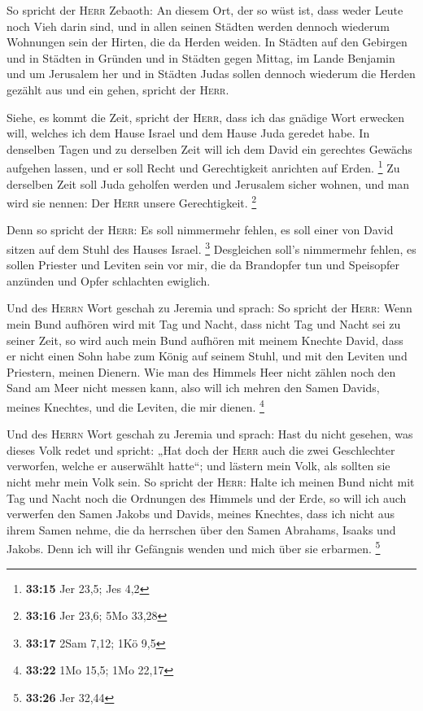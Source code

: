  So spricht der \textsc{Herr} Zebaoth: An diesem Ort, der
so wüst ist, dass weder Leute noch Vieh darin sind, und in allen seinen
Städten werden dennoch wiederum Wohnungen sein der Hirten, die da Herden
weiden.  In Städten auf den Gebirgen und in Städten in
Gründen und in Städten gegen Mittag, im Lande Benjamin und um Jerusalem
her und in Städten Judas sollen dennoch wiederum die Herden gezählt aus
und ein gehen, spricht der \textsc{Herr}.

 Siehe, es kommt die Zeit, spricht der \textsc{Herr},
dass ich das gnädige Wort erwecken will, welches ich dem Hause Israel
und dem Hause Juda geredet habe.  In denselben Tagen und
zu derselben Zeit will ich dem David ein gerechtes Gewächs aufgehen
lassen, und er soll Recht und Gerechtigkeit anrichten auf Erden.
\footnote{\textbf{33:15} Jer 23,5; Jes 4,2}  Zu derselben
Zeit soll Juda geholfen werden und Jerusalem sicher wohnen, und man wird
sie nennen: Der \textsc{Herr} unsere Gerechtigkeit. \footnote{\textbf{33:16}
  Jer 23,6; 5Mo 33,28}

 Denn so spricht der \textsc{Herr}: Es soll nimmermehr
fehlen, es soll einer von David sitzen auf dem Stuhl des Hauses Israel.
\footnote{\textbf{33:17} 2Sam 7,12; 1Kö 9,5}  Desgleichen
soll's nimmermehr fehlen, es sollen Priester und Leviten sein vor mir,
die da Brandopfer tun und Speisopfer anzünden und Opfer schlachten
ewiglich.

 Und des \textsc{Herrn} Wort geschah zu Jeremia und
sprach:  So spricht der \textsc{Herr}: Wenn mein Bund
aufhören wird mit Tag und Nacht, dass nicht Tag und Nacht sei zu seiner
Zeit,  so wird auch mein Bund aufhören mit meinem Knechte
David, dass er nicht einen Sohn habe zum König auf seinem Stuhl, und mit
den Leviten und Priestern, meinen Dienern.  Wie man des
Himmels Heer nicht zählen noch den Sand am Meer nicht messen kann, also
will ich mehren den Samen Davids, meines Knechtes, und die Leviten, die
mir dienen. \footnote{\textbf{33:22} 1Mo 15,5; 1Mo 22,17}

 Und des \textsc{Herrn} Wort geschah zu Jeremia und
sprach:  Hast du nicht gesehen, was dieses Volk redet und
spricht: „Hat doch der \textsc{Herr} auch die zwei Geschlechter
verworfen, welche er auserwählt hatte``; und lästern mein Volk, als
sollten sie nicht mehr mein Volk sein.  So spricht der
\textsc{Herr}: Halte ich meinen Bund nicht mit Tag und Nacht noch die
Ordnungen des Himmels und der Erde,  so will ich auch
verwerfen den Samen Jakobs und Davids, meines Knechtes, dass ich nicht
aus ihrem Samen nehme, die da herrschen über den Samen Abrahams, Isaaks
und Jakobs. Denn ich will ihr Gefängnis wenden und mich über sie
erbarmen. \footnote{\textbf{33:26} Jer 32,44}

